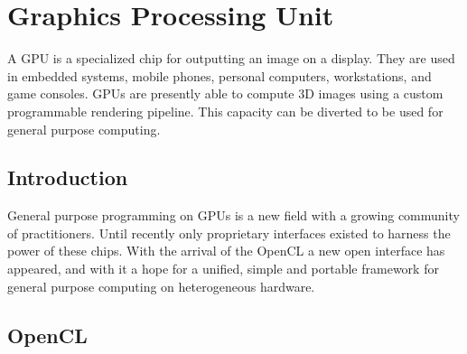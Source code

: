 %

\chapter{Graphics Processing Unit}

A \gls{GPU} is a specialized chip for outputting an image on a display. They are used in embedded systems, mobile phones, personal computers, workstations, and game consoles. \Glspl{GPU} are presently able to compute 3D images using a custom programmable rendering pipeline. This capacity can be diverted to be used for general purpose computing.

\section{Introduction}

General purpose programming on \glspl{GPU} is a new field with a growing community of practitioners. Until recently only proprietary interfaces existed to harness the power of these chips. With the arrival of the \gls{OpenCL} a new open interface has appeared, and with it a hope for a unified, simple and portable framework for general purpose computing on heterogeneous hardware.

\section{OpenCL}

